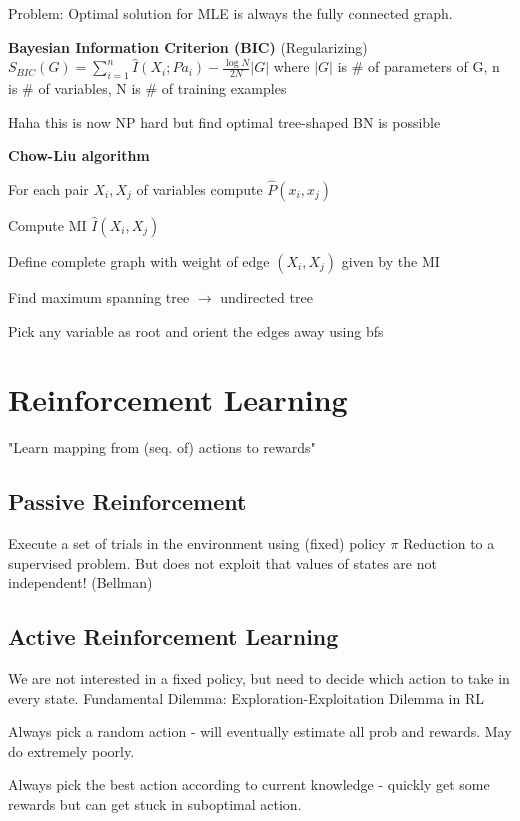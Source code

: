 \documentclass[a4paper, 11pt, landscape]{article}
\begin{document}
\begin{multicols*}{3}
Problem: Optimal solution for MLE is always the fully  connected graph. 

\textbf{Bayesian Information Criterion (BIC)}
(Regularizing) $S_{BIC}(G) = \sum_{i=1}^{n} \hat{I}(X_i ; Pa_i) - \frac{\log N}{2N} |G|$ where $|G|$ is \# of parameters of G, n is \# of variables, N is \# of training examples

Haha this is now NP hard but find optimal tree-shaped BN is possible

\textbf{Chow-Liu algorithm}
\begin{compactitem}
	\item For each pair $X_i, X_j$ of variables compute $\hat{P}(x_i, x_j)$
	\item Compute MI $\hat{I}(X_i, X_j)$
	\item Define complete graph with weight of edge $(X_i,X_j)$ given by the MI
	\item Find maximum spanning tree $\rightarrow$ undirected tree
	\item Pick any variable as root and orient the edges away using bfs

\end{compactitem}


\section{Reinforcement Learning}
"Learn mapping from (seq. of) actions to rewards"

\subsection{Passive Reinforcement}
Execute a set of trials in the environment using (fixed) policy  $\pi$
Reduction to a supervised problem. But does not exploit that values of states are not independent! (Bellman)

\subsection{Active Reinforcement Learning}
We are not interested in a fixed policy, but need to decide which action to take in every state. Fundamental Dilemma: Exploration-Exploitation Dilemma in RL

\begin{compactitem}
	\item Always pick a random action - will eventually estimate all prob and rewards. May do extremely poorly. 
	\item Always pick the best action according to current knowledge - quickly get some rewards but can get stuck in suboptimal action.
\end{compactitem}


\end{multicols*}
\end{document}
